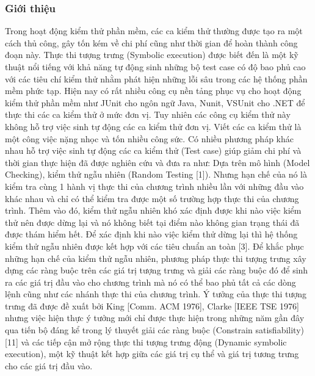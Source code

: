 \documentclass[12pt,a4paper]{article}
\begin{document}
\subsubsection{Giới thiệu}
Trong hoạt động kiểm thử phần mềm, các ca kiểm thử thường được tạo ra một cách thủ công, gây tốn kém về chi phí cũng như thời gian để hoàn thành công đoạn này. Thực thi tượng trưng (Symbolic execution) được biết đến là một kỹ thuật nổi tiếng với khả năng tự động sinh những bộ test case có độ bao phủ cao với các tiêu chí kiểm thử nhằm phát hiện những lỗi sâu trong các hệ thống phần mềm phức tạp.\newline
\indent Hiện nay có rất nhiều công cụ nền tảng phục vụ cho hoạt động kiểm thử phần mềm như JUnit cho ngôn ngữ Java, Nunit, VSUnit cho .NET để thực thi các ca kiểm thử ở mức đơn vị. Tuy nhiên các công cụ kiểm thử này không hỗ trợ việc sinh tự động các ca kiểm thử đơn vị. Viết các ca kiểm thử là một công việc nặng nhọc và tốn nhiều công sức. Có nhiều phương pháp khác nhau hỗ trợ việc sinh tự động các ca kiểm thử (Test case) giúp giảm chi phí và thời gian thực hiện đã được nghiên cứu và đưa ra như: Dựa trên mô hình (Model Checking), kiểm thử ngẫu nhiên (Random Testing [1]). Nhưng hạn chế của nó là kiểm tra cùng 1 hành vị thực thi của chương trình nhiều lần với những đầu vào khác nhau và chỉ có thể kiểm tra được một số trường hợp thực thi của chương trình. Thêm vào đó, kiểm thử ngẫu nhiên khó xác định được khi nào việc kiểm thử nên được dừng lại và nó không biết tại điểm nào không gian trạng thái đã được thám hiểm hết. Để xác định khi nào việc kiểm thử dừng lại thì hệ thống kiểm thử ngẫu nhiên được kết hợp với các tiêu chuẩn an toàn [3]. Để khắc phục những hạn chế của kiểm thử ngẫu nhiên, phương pháp thực thi tượng trưng xây dựng các ràng buộc trên các giá trị tượng trưng và giải các ràng buộc đó để sinh ra các giá trị đầu vào cho chương trình mà nó có thể bao phủ tất cả các dòng lệnh cũng như các nhánh thực thi của chương trình.\newline
\indent Ý tưởng của thực thi tượng trưng đã được đề xuất bởi King [Comm. ACM 1976], Clarke [IEEE TSE 1976] nhưng việc hiện thực ý tưởng mới chỉ được thực hiện trong những năm gần đây qua tiến bộ đáng kể trong lý thuyết giải các ràng buộc (Constrain satisfiability) [11] và các tiếp cận mở rộng thực thi tượng trưng động (Dynamic symbolic execution), một kỹ thuật kết hợp giữa các giá trị cụ thể và giá trị tương trưng cho các giá trị đầu vào.\newline
\end{document}
